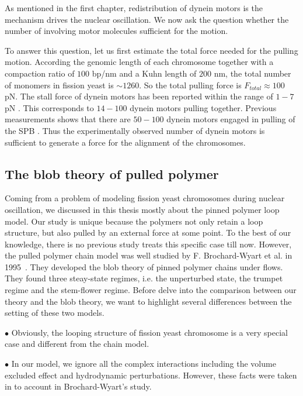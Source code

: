 As mentioned in the first chapter, redistribution of dynein motors is the mechanism drives the nuclear oscillation.  We now ask the question whether the number of involving motor molecules sufficient for the motion. 

To answer this question, let us first estimate the total force needed for the pulling motion. According the genomic length of each chromosome together with a compaction ratio of $100$ bp/nm and a Kuhn length of $200$ nm, the total number of monomers in fission yeast is $\sim 1260$. So the total pulling force is $F_{total} \approx 100$ pN. The stall force of dynein motors has been reported within the range of $1-7$ pN \cite{Toba2006,Gennerich2007}. This corresponds to $14-100$ dynein motors pulling together. Previous measurements shows that there are $50-100$ dynein motors engaged in pulling of the SPB \cite{Ananthanarayanan2013}. Thus the experimentally observed number of dynein motors is sufficient to generate a force for the alignment of the chromosomes.  

\subsection{The blob theory of pulled polymer}
\label{sub:the_blob_theory_of_pulled_polymer}

Coming from a problem of modeling fission yeast chromosomes during nuclear oscillation, we discussed in this thesis mostly about the pinned polymer loop model. Our study is unique because the polymers not only retain a loop structure, but also pulled by an external force at some point. To the best of our knowledge, there is no previous study treats this specific case till now.
However, the pulled polymer chain model was well studied by F. Brochard-Wyart et al. in 1995~\cite{Brochard-Wyart1995}. They developed the blob theory of pinned polymer chains under flows. They found three steay-state regimes, i.e. the unperturbed state, the trumpet regime and the stem-flower regime. Before delve into the comparison between our theory and the blob theory, we want to highlight several differences between the setting of these two models.

$\bullet$ Obviously, the looping structure of fission yeast chromosome is a very special case and different from the chain model. 

$\bullet$ In our model, we ignore all the complex interactions including the volume excluded effect and hydrodynamic perturbations. However, these facts were taken in to account in Brochard-Wyart's study. 


